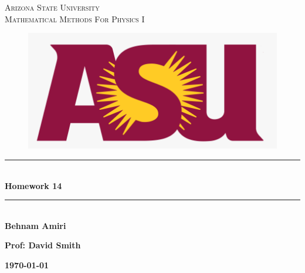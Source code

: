 \documentclass[fleqn]{article}
\begin{document}
  \begin{titlepage}

    \newcommand{\HRule}{\rule{\linewidth}{0.5mm}} %

    \center %


    \textsc{\LARGE Arizona State University}\\[1.5cm] %

    \textsc{\LARGE Mathematical Methods For Physics I }\\[1.5cm] %


    \begin{figure}
      \includegraphics[width=\linewidth]{asu.png}
    \end{figure}


    \HRule \\[0.4cm]
    { \huge \bfseries Homework 14}\\[0.4cm] 
    \HRule \\[1.5cm]

    \textbf{Behnam Amiri}

    \bigbreak

    \textbf{Prof: David Smith}

    \bigbreak


    \textbf{{\large \today}\\[2cm]}

    \vfill %

  \end{titlepage}
\end{document}
